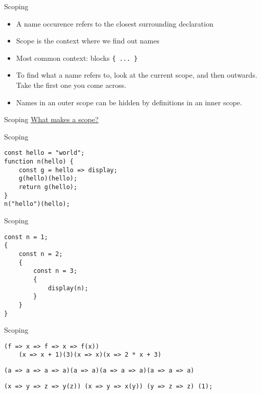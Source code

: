 \documentclass[10pt]{beamer}
\begin{document}
\begin{frame}[fragile]{Scoping}
  \begin{itemize}
    \item A name occurence refers to the closest surrounding declaration
    \item Scope is the context where we find out names
    \item Most common context: blocks \verb|{ ... }|
    \item To find what a name refers to, look at the current scope, and then outwards. Take the first one you come across.
    \item Names in an outer scope can be hidden by definitions in an inner scope.
  \end{itemize}  
\end{frame}

\begin{frame}[fragile]{Scoping}
\href{https://share.sourceacademy.nus.edu.sg/motherfuckingscopes}{\underline{What makes a scope?}}
\end{frame}

\begin{frame}[fragile]{Scoping}
  \begin{verbatim}
const hello = "world";
function n(hello) {
    const g = hello => display;
    g(hello)(hello);
    return g(hello);
}
n("hello")(hello);
  \end{verbatim}  
\end{frame}

\begin{frame}[fragile]{Scoping}
  \begin{verbatim}
const n = 1;
{
    const n = 2;
    {
        const n = 3;
        {
            display(n);
        }
    }
}
  \end{verbatim}
\end{frame}

\begin{frame}[fragile]{Scoping}
\begin{verbatim}
(f => x => f => x => f(x))
    (x => x + 1)(3)(x => x)(x => 2 * x + 3)
\end{verbatim}

\begin{verbatim}
(a => a => a => a)(a => a)(a => a => a)(a => a => a)
\end{verbatim}

\begin{verbatim}
(x => y => z => y(z)) (x => y => x(y)) (y => z => z) (1);
\end{verbatim}
\end{frame}
\end{document}
